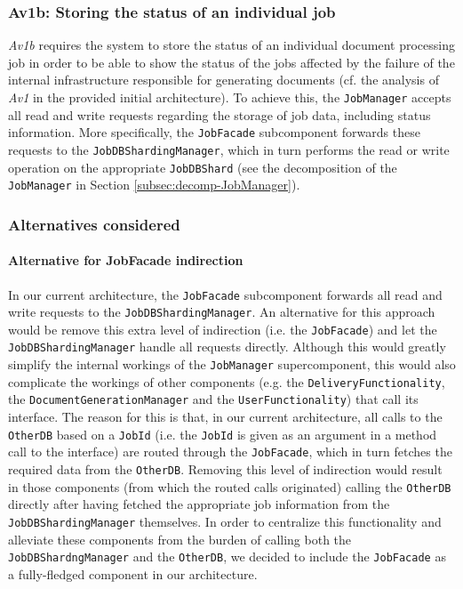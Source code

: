 \documentclass[a4paper,10pt]{article}
\begin{document}
\subsubsection{Av1b: Storing the status of an individual job}\label{subsubsec:Av1b}
\textit{Av1b} requires the system to store the status of an individual document processing job in order to be able to show the status of the jobs affected by the failure of the internal infrastructure responsible for generating documents (cf. the analysis of \textit{Av1} in the provided initial architecture). To achieve this, the \texttt{JobManager} accepts all read and write requests regarding the storage of job data, including status information. More specifically, the \texttt{JobFacade} subcomponent forwards these requests to the \texttt{JobDBShardingManager}, which in turn performs the read or write operation on the appropriate \texttt{JobDBShard} (see the decomposition of the \texttt{JobManager} in Section \ref{subsec:decomp-JobManager}).
\subsubsection*{Alternatives considered}
\paragraph{Alternative for JobFacade indirection}
In our current architecture, the \texttt{JobFacade} subcomponent forwards all read and write requests to the \texttt{JobDBShardingManager}. An alternative for this approach would be remove this extra level of indirection (i.e. the \texttt{JobFacade}) and let the \texttt{JobDBShardingManager} handle all requests directly. Although this would greatly simplify the internal workings of the \texttt{JobManager} supercomponent, this would also complicate the workings of other components (e.g. the \texttt{DeliveryFunctionality}, the \texttt{DocumentGenerationManager} and the \texttt{UserFunctionality}) that call its interface. The reason for this is that, in our current architecture, all calls to the \texttt{OtherDB} based on a \texttt{JobId} (i.e. the \texttt{JobId} is given as an argument in a method call to the interface) are routed through the \texttt{JobFacade}, which in turn fetches the required data from the \texttt{OtherDB}. Removing this level of indirection would result in those components (from which the routed calls originated) calling the \texttt{OtherDB} directly after having fetched the appropriate job information from the \texttt{JobDBShardingManager} themselves. In order to centralize this functionality and alleviate these components from the burden of calling both the \texttt{JobDBShardngManager} and the \texttt{OtherDB}, we decided to include the \texttt{JobFacade} as a fully-fledged component in our architecture.
\end{document}
